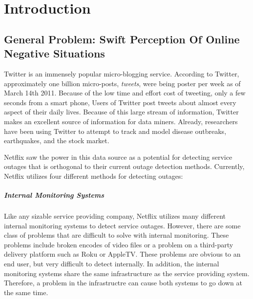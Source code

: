 \documentclass[12pt]{ucthesis}
\begin{document}
\pagestyle{plain}

\renewcommand{\baselinestretch}{1.66}


\chapter{Introduction}
\label{introduction}

\section{General Problem: Swift Perception Of Online Negative Situations}
\label{general-problem}

Twitter is an immensely popular micro-blogging service. According to Twitter,
approximately one billion micro-posts, \emph{tweets}, were being poster per week as of March 14th 2011\cite{TwitterBlog}.
Because of the low time and effort cost of tweeting, only a few seconds from a smart phone,
Users of Twitter post tweets about almost every aspect of their daily lives.
Because of this large stream of information, Twitter makes an excellent source of information for
data miners. Already, researchers have been using Twitter to attempt to track and model
disease outbreaks\cite{DetectingInfluenza}, earthquakes\cite{Earthquakes}, and the
stock market\cite{StockMarket}.

Netflix saw the power in this data source as a potential for detecting service outages that
is orthogonal to their current outage detection methods. Currently, Netflix utilizes four
different methods for detecting outages:

\paragraph{Internal Monitoring Systems}
Like any sizable service providing company, Netflix utilizes many different internal monitoring
systems to detect service outages. However, there are some class of problems that are difficult to solve
with internal monitoring. These problems include broken encodes of video files or a problem on a third-party delivery
platform such as Roku or AppleTV. These problems are obvious to an end user, but very difficult to detect internally.
In addition, the internal monitoring systems share the same infrastructure as the service providing system. Therefore,
a problem in the infrastructre can cause both systems to go down at the same time.
\end{document}
